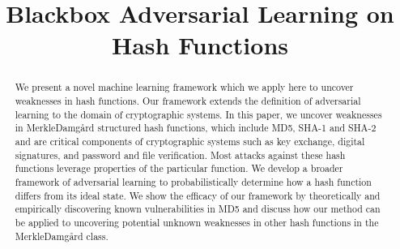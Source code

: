 \documentclass[letterpaper,twocolumn,10pt]{article}
\begin{document}

\date{}

\title{\Large \bf Blackbox Adversarial Learning on Hash Functions}


\maketitle

\begin{abstract}
We present a novel machine learning framework which we apply here to uncover weaknesses in hash functions. Our framework extends the definition of adversarial learning to the domain of cryptographic systems. In this paper, we uncover weaknesses in Merkle{\textendash}Damg\r{a}rd structured hash functions, which include MD5, SHA-1 and SHA-2 and are critical components of cryptographic systems such as key exchange, digital signatures, and password and file verification. Most attacks against these hash functions leverage properties of the particular function. We develop a broader framework of adversarial learning to probabilistically determine how a hash function differs from its ideal state. We show the efficacy of our framework by theoretically and empirically discovering known vulnerabilities in MD5 and discuss how our method can be applied to uncovering potential unknown weaknesses in other hash functions in the Merkle{\textendash}Damg\r{a}rd class.
\end{abstract}

\end{document}

